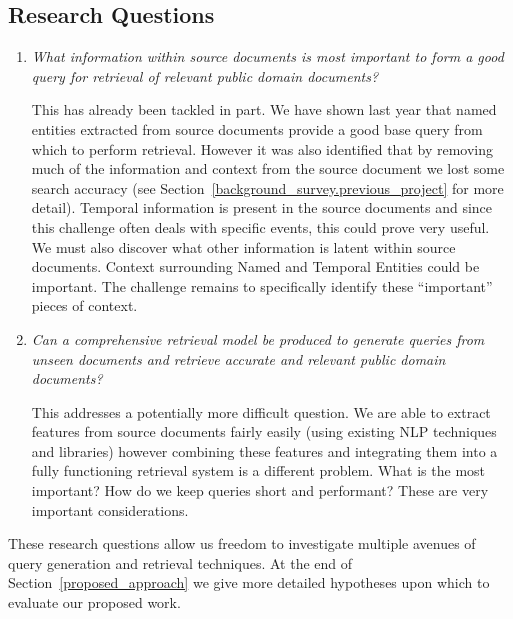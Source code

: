 \documentclass{mprop}
\begin{document}
\subsection{Research Questions}
\begin{enumerate}[label=\textbf{RQ.\arabic*}]
\item \textit{What information within source documents is most important to form a good query for retrieval of relevant public domain documents?}

This has already been tackled in part. We have shown last year that named entities extracted from source documents provide a good base query from which to perform retrieval. However it was also identified that by removing much of the information and context from the source document we lost some search accuracy (see Section~\ref{background_survey.previous_project} for more detail). Temporal information is present in the source documents and since this challenge often deals with specific events, this could prove very useful. We must also discover what other information is latent within source documents. Context surrounding Named and Temporal Entities could be important. The challenge remains to specifically identify these ``important'' pieces of context.

\item \textit{Can a comprehensive retrieval model be produced to generate queries from unseen documents and retrieve accurate and relevant public domain documents?}

This addresses a potentially more difficult question. We are able to extract features from source documents fairly easily (using existing NLP techniques and libraries) however combining these features and integrating them into a fully functioning retrieval system is a different problem. What is the most important? How do we keep queries short and performant? These are very important considerations.
\end{enumerate}

These research questions allow us freedom to investigate multiple avenues of query generation and retrieval techniques. At the end of Section~\ref{proposed_approach} we give more detailed hypotheses upon which to evaluate our proposed work.
\end{document}
